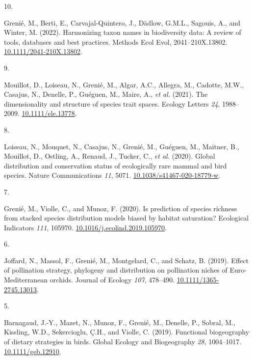 \documentclass[10pt,a4paper,]{article}
\newlength{\cslhangindent}
\newlength{\csllabelwidth}
\newcommand{\CSLLeftMargin}[1]{\parbox[t]{\csllabelwidth}{\hfill #1~}}
\newcommand{\CSLRightInline}[1]{\parbox[t]{\linewidth - \cslhangindent - \csllabelwidth}{#1}\vspace{0.8ex}}
\begin{document}
\leavevmode{}%
\CSLLeftMargin{10. }%
\CSLRightInline{Grenié, M., Berti, E., Carvajal-Quintero, J., Dädlow,
G.M.L., Sagouis, A., and Winter, M. (2022). Harmonizing taxon names in
biodiversity data: A review of tools, databases and best practices.
Methods Ecol Evol, 2041--210X.13802.
\href{https://doi.org/10.1111/2041-210X.13802}{10.1111/2041-210X.13802}.}

\leavevmode{}%
\CSLLeftMargin{9. }%
\CSLRightInline{Mouillot, D., Loiseau, N., Grenié, M., Algar, A.C.,
Allegra, M., Cadotte, M.W., Casajus, N., Denelle, P., Guéguen, M.,
Maire, A., \emph{et al.} (2021). The dimensionality and structure of
species trait spaces. Ecology Letters \emph{24}, 1988--2009.
\href{https://doi.org/10.1111/ele.13778}{10.1111/ele.13778}.}

\leavevmode{}%
\CSLLeftMargin{8. }%
\CSLRightInline{Loiseau, N., Mouquet, N., Casajus, N., Grenié, M.,
Guéguen, M., Maitner, B., Mouillot, D., Ostling, A., Renaud, J., Tucker,
C., \emph{et al.} (2020). Global distribution and conservation status of
ecologically rare mammal and bird species. Nature Communications
\emph{11}, 5071.
\href{https://doi.org/10.1038/s41467-020-18779-w}{10.1038/s41467-020-18779-w}.}

\leavevmode{}%
\CSLLeftMargin{7. }%
\CSLRightInline{Grenié, M., Violle, C., and Munoz, F. (2020). Is
prediction of species richness from stacked species distribution models
biased by habitat saturation? Ecological Indicators \emph{111}, 105970.
\href{https://doi.org/10.1016/j.ecolind.2019.105970}{10.1016/j.ecolind.2019.105970}.}

\leavevmode{}%
\CSLLeftMargin{6. }%
\CSLRightInline{Joffard, N., Massol, F., Grenié, M., Montgelard, C., and
Schatz, B. (2019). Effect of pollination strategy, phylogeny and
distribution on pollination niches of Euro-Mediterranean orchids.
Journal of Ecology \emph{107}, 478--490.
\href{https://doi.org/10.1111/1365-2745.13013}{10.1111/1365-2745.13013}.}

\leavevmode{}%
\CSLLeftMargin{5. }%
\CSLRightInline{Barnagaud, J.-Y., Mazet, N., Munoz, F., Grenié, M.,
Denelle, P., Sobral, M., Kissling, W.D., Sekercioglu, Ç.H., and Violle,
C. (2019). Functional biogeography of dietary strategies in birds.
Global Ecology and Biogeography \emph{28}, 1004--1017.
\href{https://doi.org/10.1111/geb.12910}{10.1111/geb.12910}.}
\end{document}
